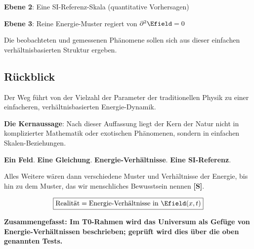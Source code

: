 	\textbf{Ebene 2}: Eine SI-Referenz-Skala (quantitative Vorhersagen)
	
	\textbf{Ebene 3}: Reine Energie-Muster regiert von $\partial^2 \Efield = 0$
	
	Die beobachteten und gemessenen Phänomene sollen sich aus dieser einfachen verhältnisbasierten Struktur ergeben.
	
	\subsection{Rückblick}
	
	Der Weg führt von der Vielzahl der Parameter der traditionellen Physik zu einer einfacheren, verhältnisbasierten Energie-Dynamik.
	
	\textbf{Die Kernaussage}: Nach dieser Auffassung liegt der Kern der Natur nicht in komplizierter Mathematik oder exotischen Phänomenen, sondern in einfachen Skalen-Beziehungen.
	
	\textbf{Ein Feld}. \textbf{Eine Gleichung}. \textbf{Energie-Verhältnisse}. \textbf{Eine SI-Referenz}.
	
	Alles Weitere wären dann verschiedene Muster und Verhältnisse der Energie, bis hin zu dem Muster, das wir menschliches Bewusstsein nennen \textbf{[S]}.
	
	\begin{equation}
		\boxed{\text{Realität} = \text{Energie-Verhältnisse in } \Efield(x,t)}
	\end{equation}
	
	\textbf{Zusammengefasst: Im T0-Rahmen wird das Universum als Gefüge von Energie-Verhältnissen beschrieben; geprüft wird dies über die oben genannten Tests.}
	

